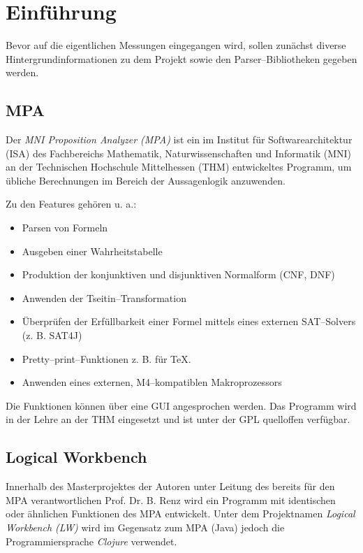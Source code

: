 \documentclass[ngerman,a4paper,abstracton,open=right,twoside=false,toc=listofnumbered,bibtotocnumbered]{scrreprt}
\begin{document}
\chapter{Einführung}

Bevor auf die eigentlichen Messungen eingegangen wird, sollen zunächst diverse Hintergrundinformationen zu dem Projekt sowie den Parser--Bibliotheken gegeben werden.

\section{MPA}

Der \emph{MNI Proposition Analyzer (MPA)} ist ein im Institut für Softwarearchitektur (ISA) des Fachbereichs Mathematik, Naturwissenschaften und Informatik (MNI) an der Technischen Hochschule Mittelhessen (THM) entwickeltes Programm, um übliche Berechnungen im Bereich der Aussagenlogik anzuwenden. \cite{mpa}

Zu den Features gehören u. a.:

\begin{itemize}
	\item Parsen von Formeln
	\item Ausgeben einer Wahrheitstabelle
	\item Produktion der konjunktiven und disjunktiven Normalform (CNF, DNF)
	\item Anwenden der Tseitin--Transformation
	\item Überprüfen der Erfüllbarkeit einer Formel mittels eines externen SAT--Solvers (z. B. SAT4J)
	\item Pretty--print--Funktionen z. B. für \TeX{}.
	\item Anwenden eines externen, M4--kompatiblen Makroprozessors
\end{itemize}

Die Funktionen können über eine GUI angesprochen werden. Das Programm wird in der Lehre an der THM eingesetzt und ist unter der GPL quelloffen verfügbar.

\section{Logical Workbench}

Innerhalb des Masterprojektes der Autoren unter Leitung des bereits für den MPA verantwortlichen Prof. Dr. B. Renz wird ein Programm mit identischen oder ähnlichen Funktionen des MPA entwickelt. Unter dem Projektnamen \emph{Logical Workbench (LW)} wird im Gegensatz zum MPA (Java) jedoch die Programmiersprache \emph{Clojure} verwendet.
\end{document}
